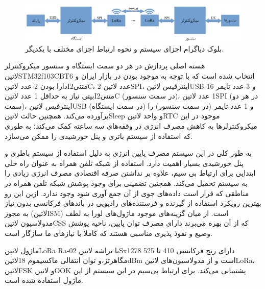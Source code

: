 \begin{figure}[!h]
	\centering
	\includegraphics[width=\linewidth]{Assets/system design.pdf}
	\caption{بلوک دیاگرام اجزای سیستم و نحوه ارتباط اجزای مختلف با یکدیگر.}
	\label{fig:systemDesign}
\end{figure}


هسته اصلی پردازش در هر دو سمت ایستگاه و سنسور میکروکنترلر ‌لاتین{STM32f103CBT6} انتخاب شده است که با توجه به موجود بودن در بازار ایران و دارا بودن 2 عدد ‌لاتین{I‌متنی{2}C}، 2 عدد ‌لاتین{SPI}، اینترفیس ‌لاتین{USB} و 3 عدد تایمر 16 بیتی نیاز به حداقل 1 عدد ‌لاتین{I‌متنی{2}C} (در سمت سنسور)، 1 عدد ‌لاتین{SPI} (در هر دو سمت)، اینترفیس ‌لاتین{USB} (در سمت ایستگاه)  و 1 عدد تایمر (در سمت سنسور) را برآورده می‌کند. همچنین حالت ‌لاتین{Sleep} و واحد ‌لاتین{RTC} موجود در این میکروکنترلر‌ها به کاهش مصرف انرژی در وقفه‌های سه ساعته کمک می‌کند؛ به طوری که استفاده از سیستم باتری و پنل خورشیدی را ممکن می‌سازد.

به طور کلی در این سیستم مصرف پایین انرژی به دلیل استفاده از سیستم باطری و پنل خورشیدی بسیار اهمیت دارد. استفاده از شبکه تلفن همراه به عنوان راه حلی ابتدایی برای ارتباط بی سیم، علاوه بر نداشتن صرفه اقتصادی مصرف انرژی زیادی را به سیستم تحمیل می‌کند. همچنین تضمینی برای وجود پوشش شبکه تلفن همراه در مناطقی که قرار است داده‌های جوی از آن جمع آوری شود وجود ندارد. ازین این رو بهترین رویکرد استفاده از گیرنده و فرستنده‌های رادیویی در باندهای فرکانسی بدون نیاز به مجوز (‌لاتین{ISM}) است. از میان گزینه‌های موجود ماژول‌های لورا به لطف مدولاسیون ‌لاتین{CSS} که از آن بهره می‌برند دارای مصرف توان پایین، ناحیه پوشش وصیع و نفوذ پذیری مناسبی هستند که کاملا با نیازهای ما سازگار است. 

ماژول ‌لاتین{LoRa Ra-02} با تراشه ‌لاتین{Sx1278} دارای رنج فرکانسی 410 تا 525 مگاهرتز،و توان انتقالی ماکسیموم 18‌لاتین{dBm} است و از مدولاسیون‌‌های ‌لاتین{LoRa}، ‌لاتین{FSK} و ‌لاتین{OOK} پشتیبانی می‌کند. برای ارتباط بی‌سیم در این سیستم از این ماژول استفاده شده است. 

